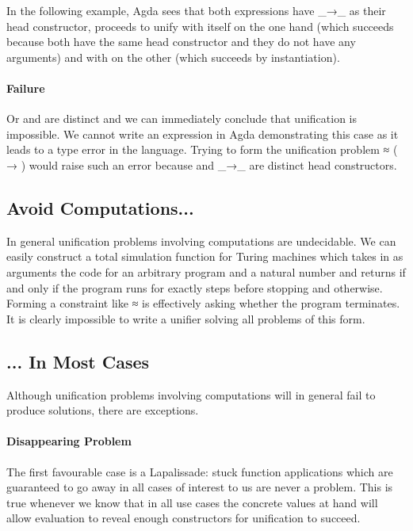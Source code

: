 In the following example, Agda sees that both expressions have {\_→\_} as their
head constructor, proceeds to unify  with itself on the one hand (which
succeeds because both have the same head constructor and they do not have any
arguments) and  with  on the other (which succeeds by instantiation).


\paragraph{Failure} Or  and  are distinct and we can immediately
conclude that unification is impossible. We cannot write an expression in Agda
demonstrating this case as it leads to a type error in the language.
Trying to form the unification problem { ≈ (\AB{\_} → \AB{\_})} would
raise such an error because  and {\_→\_} are distinct head constructors.

\subsection{Avoid Computations...}

In general unification problems involving computations are undecidable.
We can easily construct a total simulation function  for Turing
machines which takes in as arguments the code for an arbitrary program 
and a natural number  and returns  if and only if the program runs
for exactly  steps before stopping and  otherwise. Forming a
constraint like {  \AB{\_} ≈ } is effectively asking
whether the program  terminates. It is clearly impossible to write a
unifier solving all problems of this form.

\subsection{... In Most Cases}\label{sec:unifiermagic}

Although unification problems involving computations will in general fail
to produce solutions, there are exceptions.


\paragraph{Disappearing Problem} The first favourable case is a Lapalissade:
stuck function applications which are guaranteed to go away in all cases of
interest to us are never a problem. This is true whenever we know that in all
use cases the concrete values at hand will allow evaluation to reveal enough
constructors for unification to succeed.

